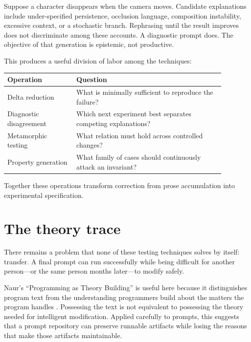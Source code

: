 \documentclass[11pt]{article}
\begin{document}
Suppose a character disappears when the camera moves. Candidate explanations include under-specified persistence, occlusion language, composition instability, excessive context, or a stochastic branch. Rephrasing until the result improves does not discriminate among these accounts. A diagnostic prompt does. The objective of that generation is epistemic, not productive.

This produces a useful division of labor among the techniques:

\begin{center}
\begin{tabular}{>{\raggedright\arraybackslash}p{0.28\linewidth} >{\raggedright\arraybackslash}p{0.60\linewidth}}
\toprule
\textbf{Operation} & \textbf{Question}\\
\midrule
Delta reduction & What is minimally sufficient to reproduce the failure?\\
Diagnostic disagreement & Which next experiment best separates competing explanations?\\
Metamorphic testing & What relation must hold across controlled changes?\\
Property generation & What family of cases should continuously attack an invariant?\\
\bottomrule
\end{tabular}
\end{center}

Together these operations transform correction from prose accumulation into experimental specification.

\section{The theory trace}

There remains a problem that none of these testing techniques solves by itself: transfer. A final prompt can run successfully while being difficult for another person---or the same person months later---to modify safely.

Naur's ``Programming as Theory Building'' is useful here because it distinguishes program text from the understanding programmers build about the matters the program handles \cite{naur1985programming}. Possessing the text is not equivalent to possessing the theory needed for intelligent modification. Applied carefully to prompts, this suggests that a prompt repository can preserve runnable artifacts while losing the reasons that make those artifacts maintainable.
\end{document}

